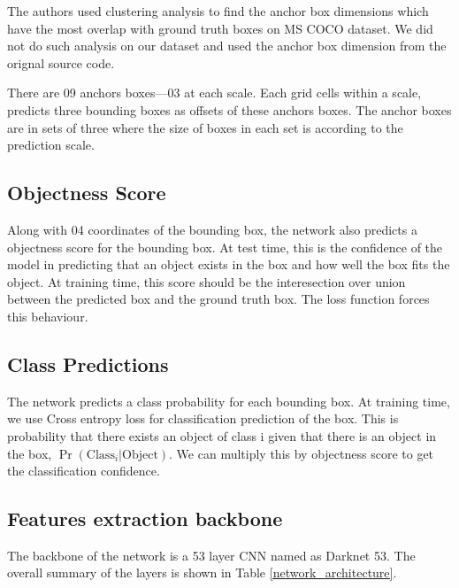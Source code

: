 \documentclass[10pt,twocolumn,letterpaper]{article}
\begin{document}
The authors used clustering analysis to find the anchor box dimensions which have the most overlap with ground truth boxes on MS COCO dataset. We did not do such analysis on our dataset and used the anchor box dimension from the orignal source code.

There are 09 anchors boxes---03 at each scale. Each grid cells within a scale, predicts three bounding boxes as offsets of these anchors boxes. The anchor boxes are in sets of three where the size of boxes in each set is according to the prediction scale.

\subsection{Objectness Score}
Along with 04 coordinates of the bounding box, the network also predicts a objectness score for the bounding box. At test time, this is the confidence of the model in predicting that an object exists in the box and how well the box fits the object. At training time, this score should be the interesection over union between the predicted box and the ground truth box. The loss function forces this behaviour.

\subsection{Class Predictions}
The network predicts a class probability for each bounding box. At training time, we use Cross entropy loss for classification prediction of the box. This is probability that there exists an object of class i given that there is an object in the box, $\Pr(\textrm{Class}_i | \textrm{Object})$. We can multiply this by objectness score to get the classification confidence.

\subsection{Features extraction backbone}
The backbone of the network is a 53 layer CNN named as Darknet 53. The overall summary of the layers is shown in Table \ref{network_architecture}. 
\end{document}
